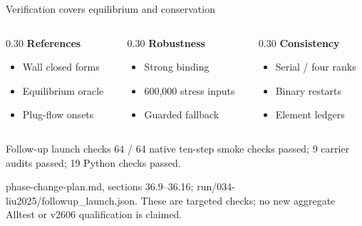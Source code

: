 \documentclass[aspectratio=169,10pt]{beamer}
\newcommand{\sources}[1]{\par\vfill{\raggedright\fontsize{6.2}{7.5}\selectfont\color{PSIgray}#1\par}}
\begin{document}
\begin{frame}[t]{Verification covers equilibrium and conservation}
  \begin{columns}[t,onlytextwidth]
    \begin{column}{0.30\textwidth}
      \textbf{References}\par
      \begin{itemize}\small
        \item Wall closed forms
        \item Equilibrium oracle
        \item Plug-flow onsets
      \end{itemize}
    \end{column}
    \begin{column}{0.30\textwidth}
      \textbf{Robustness}\par
      \begin{itemize}\small
        \item Strong binding
        \item 600,000 stress inputs
        \item Guarded fallback
      \end{itemize}
    \end{column}
    \begin{column}{0.30\textwidth}
      \textbf{Consistency}\par
      \begin{itemize}\small
        \item Serial / four ranks
        \item Binary restarts
        \item Element ledgers
      \end{itemize}
    \end{column}
  \end{columns}
  \vspace{0.4em}
  \begin{block}{Follow-up launch checks}
    \small 64 / 64 native ten-step smoke checks passed; 9 carrier audits passed; 19 Python checks passed.
  \end{block}
  \sources{phase-change-plan.md, sections 36.9--36.16; run/034-liu2025/followup\_launch.json. These are targeted checks; no new aggregate Alltest or v2606 qualification is claimed.}
\end{frame}
\end{document}

